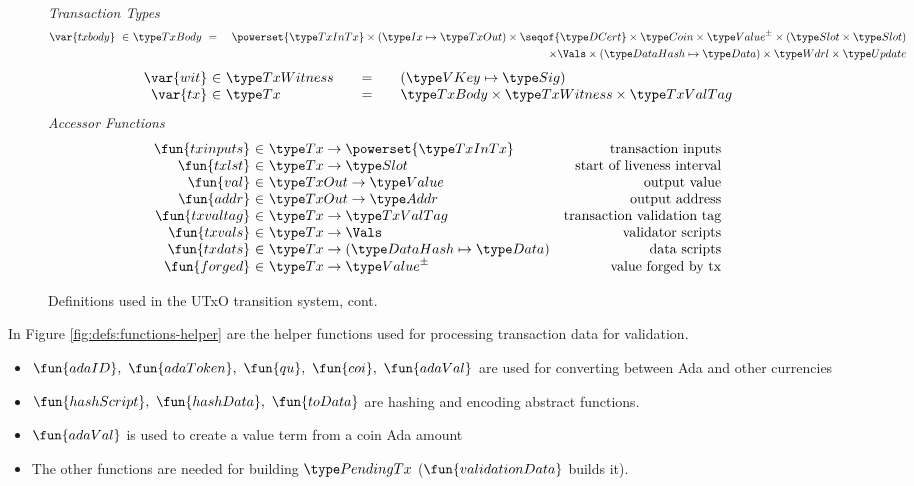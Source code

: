 \begin{figure*}[htb]
  \emph{Transaction Types}
  \begin{align*}
    \var{txbody} ~\in~
    & \TxBody ~=~
    & \powerset{\TxInTx} \times (\Ix \mapsto \TxOut) \times \seqof{\DCert}
      \times \Coin \times \ValuePM \times (\Slot\times\Slot) \\
    &~& \times \Vals \times (\HashDat \mapsto \Data)
    \times \Wdrl \times \Update
  \end{align*}
  \begin{equation*}
    \begin{array}{r@{~\in~}l@{\qquad=\qquad}l}
      \var{wit} & \TxWitness & (\VKey \mapsto \Sig)
      \\
      \var{tx}
      & \Tx
      & \TxBody \times \TxWitness \times \TxValTag
    \end{array}
  \end{equation*}
  \emph{Accessor Functions}
  \begin{equation*}
    \begin{array}{r@{~\in~}lr}
      \fun{txinputs} & \Tx \to \powerset{\TxInTx} & \text{transaction inputs} \\
      \fun{txlst} & \Tx \to \Slot & \text{start of liveness interval} \\
      \fun{val} & \TxOut \to \Value & \text{output value} \\
      \fun{addr} & \TxOut \to \Addr & \text{output address} \\
      \fun{txvaltag} & \Tx \to \TxValTag & \text{transaction validation tag}\\
      \fun{txvals} & \Tx \to \Vals & \text{validator scripts}\\
      \fun{txdats} & \Tx \to (\HashDat \mapsto \Data) & \text{data scripts}\\
      \fun{forged} & \Tx \to \ValuePM & \text{value forged by tx}\\
    \end{array}
  \end{equation*}
  \caption{Definitions used in the UTxO transition system, cont.}
  \label{fig:defs:utxo-shelley-2}
\end{figure*}


In Figure \ref{fig:defs:functions-helper} are the helper functions used for
processing transaction data for validation.

\begin{itemize}
  \item $\fun{adaID},~\fun{adaToken},~\fun{qu},~\fun{coi},~\fun{adaVal}$ are used
  for converting between Ada and other currencies
  \item $\fun{hashScript},~ \fun{hashData},~\fun{toData}$ are hashing and encoding
  abstract functions.
  \item $\fun{adaVal}$ is used to create a value term from a coin Ada amount
  \item The other functions are needed for building $\PendingTx$
  ($\fun{validationData}$ builds it).
\end{itemize}

